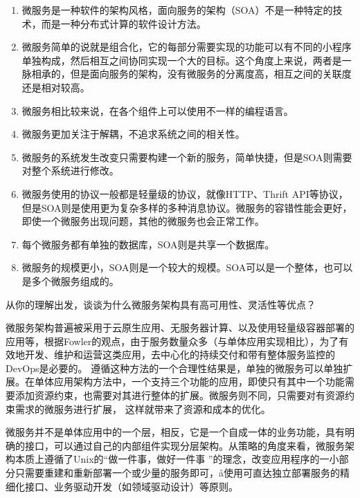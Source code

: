 \begin{solution}
\begin{enumerate}[label=\arabic*.]
    \item 微服务是一种软件的架构风格，面向服务的架构（SOA）不是一种特定的技术，而是一种分布式计算的软件设计方法。
    \item 微服务简单的说就是组合化，它的每部分需要实现的功能可以有不同的小程序单独构成，然后相互之间协同实现一个大的目标。这个角度上来说，两者是一脉相承的，但是面向服务的架构，没有微服务的分离度高，相互之间的关联度还是相对较高。
    \item 微服务相比较来说，在各个组件上可以使用不一样的编程语言。
    \item 微服务更加关注于解耦，不追求系统之间的相关性。
    \item 微服务的系统发生改变只需要构建一个新的服务，简单快捷，但是SOA则需要对整个系统进行修改。
    \item 微服务使用的协议一般都是轻量级的协议，就像HTTP、Thrift API等协议，但是SOA则是使用更为复杂多样的多种消息协议。微服务的容错性能会更好，即使一个微服务出现问题，其他的微服务也会正常工作。
    \item 每个微服务都有单独的数据库，SOA则是共享一个数据库。
    \item 微服务的规模更小，SOA则是一个较大的规模。SOA可以是一个整体，也可以是多个微服务组成的。
\end{enumerate}
\end{solution}



\begin{problem}
从你的理解出发，谈谈为什么微服务架构具有高可用性、灵活性等优点？
\end{problem}

\begin{solution}
微服务架构普遍被采用于云原生应用、无服务器计算、以及使用轻量级容器部署的应用等，根据Fowler的观点，由于服务数量众多（与单体应用实现相比），为了有效地开发、维护和运营这类应用，去中心化的持续交付和带有整体服务监控的DevOps是必要的。 遵循这种方法的一个合理性结果是，单独的微服务可以单独扩展。在单体应用架构方法中，一个支持三个功能的应用，即使只有其中一个功能需要添加资源约束，也需要对其进行整体的扩展。微服务则不同，只需要对有资源约束需求的微服务进行扩展， 这样就带来了资源和成本的优化。

微服务并不是单体应用中的一个层，相反，它是一个自成一体的业务功能，具有明确的接口，可以通过自己的内部组件实现分层架构。从策略的角度来看，微服务架构本质上遵循了Unix的“做一件事，做好一件事 ”的理念，改变应用程序的一小部分只需要重建和重新部署一个或少量的服务即可，å使用可直达独立部署服务的精细化接口、业务驱动开发（如领域驱动设计）等原则。
\end{solution}
